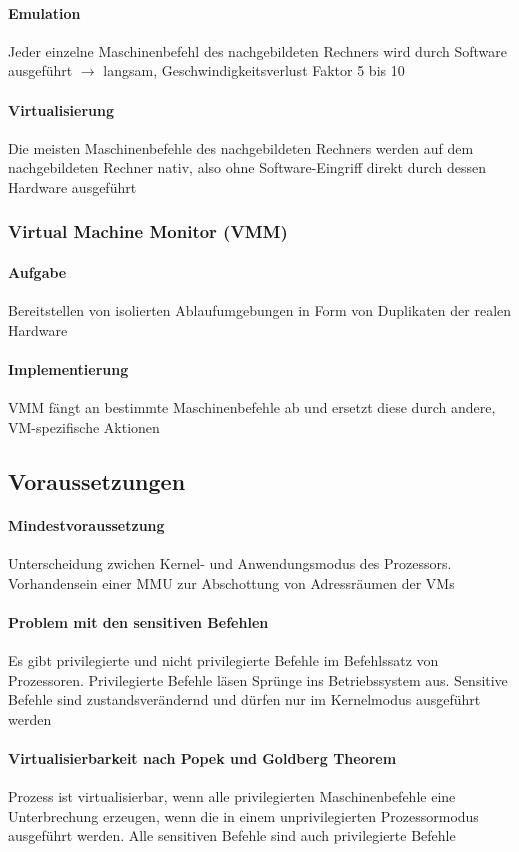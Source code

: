 \documentclass[10pt,a4paper,landscape]{article}
\begin{document}
\begin{multicols*}{3}
	\paragraph{Emulation} Jeder einzelne Maschinenbefehl des nachgebildeten Rechners wird durch Software ausgeführt $\rightarrow$ langsam, Geschwindigkeitsverlust Faktor 5 bis 10
	\paragraph{Virtualisierung} Die meisten Maschinenbefehle des nachgebildeten Rechners werden auf dem nachgebildeten Rechner nativ, also ohne Software-Eingriff direkt durch dessen Hardware ausgeführt
	\subsubsection{Virtual Machine Monitor (VMM)}
	\paragraph{Aufgabe} Bereitstellen von isolierten Ablaufumgebungen in Form von Duplikaten der realen Hardware
	\paragraph{Implementierung} VMM fängt an bestimmte Maschinenbefehle ab und ersetzt diese durch andere, VM-spezifische Aktionen
	\subsection{Voraussetzungen}
	\paragraph{Mindestvoraussetzung} Unterscheidung zwichen Kernel- und Anwendungsmodus des Prozessors. Vorhandensein einer MMU zur Abschottung von Adressräumen der VMs
	\paragraph{Problem mit den sensitiven Befehlen} Es gibt privilegierte und nicht privilegierte Befehle im Befehlssatz von Prozessoren. Privilegierte Befehle läsen Sprünge ins Betriebssystem aus. Sensitive Befehle sind zustandsverändernd und dürfen nur im Kernelmodus ausgeführt werden
	\paragraph{Virtualisierbarkeit nach Popek und Goldberg Theorem} Prozess ist virtualisierbar, wenn alle privilegierten Maschinenbefehle eine Unterbrechung erzeugen, wenn die in einem unprivilegierten Prozessormodus ausgeführt werden. Alle sensitiven Befehle sind auch privilegierte Befehle

\end{multicols*}
\end{document}
